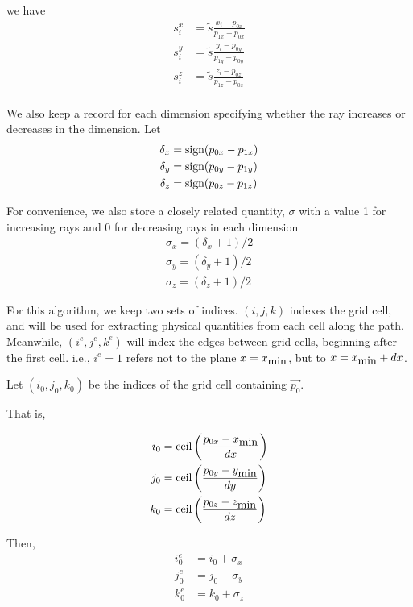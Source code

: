 we have
\begin{align}
  s_i^x &= \tilde{s}\frac{x_i-p_{0x}}{p_{1x}-p_{0x}} \\
  s_i^y &= \tilde{s}\frac{y_i-p_{0y}}{p_{1y}-p_{0y}} \\
  s_i^z &= \tilde{s}\frac{z_i-p_{0z}}{p_{1z}-p_{0z}} \\
\end{align}


We also keep a record for each dimension specifying whether the ray increases
or decreases in the dimension. Let
\begin{align}
  \delta_x &= \mbox{sign}(p_{0x}-p_{1x}) \\
  \delta_y &= \mbox{sign}(p_{0y}-p_{1y}) \\
  \delta_z &= \mbox{sign}(p_{0z}-p_{1z})
\end{align}

For convenience, we also store a closely related quantity, $\sigma$ with a value 1 for
increasing rays and 0 for decreasing rays in each dimension
\begin{align}
  \sigma_x = (\delta_x+1)/2 \\
  \sigma_y = (\delta_y+1)/2 \\
  \sigma_z = (\delta_z+1)/2
\end{align}

For this algorithm, we keep two sets of indices. $(i,j,k)$ indexes the grid
cell, and will be used for extracting physical quantities from each cell along
the path.
Meanwhile, $(i^e,j^e,k^e)$ will index the edges between grid cells, beginning
after the first cell. i.e., $i^e=1$ refers not to the plane $x=x_{\mbox{min}}$, but to $x=x_{\mbox{min}}+dx$.

Let $(i_0, j_0, k_0)$ be the indices of the grid cell containing $\vec{p_0}$.

That is,

\begin{align}
  i_0 &= \mbox{ceil}\left(\frac{p_{0x}-x_{\mbox{min}}}{dx}\right) \\
  j_0 &= \mbox{ceil}\left(\frac{p_{0y}-y_{\mbox{min}}}{dy}\right) \\
  k_0 &= \mbox{ceil}\left(\frac{p_{0z}-z_{\mbox{min}}}{dz}\right)
\end{align}

Then,
\begin{align}
  i_0^e &= i_0 + \sigma_x \\
  j_0^e &= j_0 + \sigma_y \\
  k_0^e &= k_0 + \sigma_z
\end{align}

